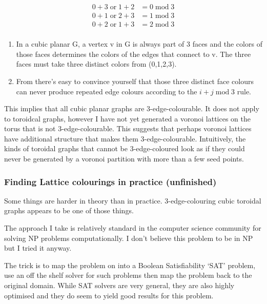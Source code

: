 \[\begin{aligned}
0 + 3 \;\mathrm{or}\; 1 + 2 &= 0 \;\mathrm{mod}\; 3\\ 
0 + 1 \;\mathrm{or}\; 2 + 3 &= 1 \;\mathrm{mod}\; 3\\
0 + 2 \;\mathrm{or}\;1 + 3 &= 2 \;\mathrm{mod}\; 3\\
\end{aligned}
\]

\begin{enumerate}
\def\labelenumi{\arabic{enumi}.}
\setcounter{enumi}{2}
\tightlist
\item
  In a cubic planar G, a vertex v in G is always part of 3 faces and the
  colors of those faces determines the colors of the edges that connect
  to v. The three faces must take three distinct colors from (0,1,2,3).
\item
  From there's easy to convince yourself that those three distinct face
  colours can never produce repeated edge colours according to the
  \(i+j \;\mathrm{mod}\; 3\) rule.
\end{enumerate}

This implies that all cubic planar graphs are 3-edge-colourable. It does
not apply to toroidcal graphs, however I have not yet generated a
voronoi lattices on the torus that is not 3-edge-colourable. This
suggests that perhaps voronoi lattices have additional structure that
makes them 3-edge-colourable. Intuitively, the kinds of toroidal graphs
that cannot be 3-edge-coloured look as if they could never be generated
by a voronoi partition with more than a few seed points.

\hypertarget{finding-lattice-colourings-in-practice-unfinished}{%
\subsubsection{Finding Lattice colourings in practice
(unfinished)}\label{finding-lattice-colourings-in-practice-unfinished}}

Some things are harder in theory than in practice. 3-edge-colouring
cubic toroidal graphs appears to be one of those things.

The approach I take is relatively standard in the computer science
community for solving NP problems computationally. I don't believe this
problem to be in NP but I tried it anyway.

The trick is to map the problem on into a Boolean Satisfiability `SAT'
problem, use an off the shelf solver for such problems then map the
problem back to the original domain. While SAT solvers are very general,
they are also highly optimised and they do seem to yield good results
for this problem.

